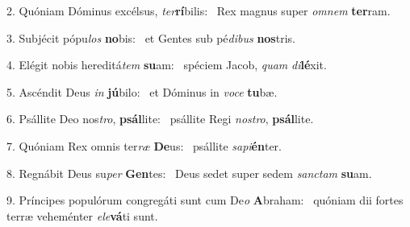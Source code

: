 2. Quóniam Dóminus excélsus, \textit{ter}\textbf{rí}bilis: \ast\  Rex magnus super \textit{om}\textit{nem} \textbf{ter}ram.\

3. Subjécit pópu\textit{los} \textbf{no}bis: \ast\  et Gentes sub pé\textit{di}\textit{bus} \textbf{nos}tris.\

4. Elégit nobis hereditá\textit{tem} \textbf{su}am: \ast\  spéciem Jacob, \textit{quam} \textit{di}\textbf{lé}xit.\

5. Ascéndit Deus \textit{in} \textbf{jú}bilo: \ast\  et Dóminus in \textit{vo}\textit{ce} \textbf{tu}bæ.\

6. Psállite Deo nos\textit{tro}, \textbf{psál}lite: \ast\  psállite Regi \textit{nos}\textit{tro}, \textbf{psál}lite.\

7. Quóniam Rex omnis ter\textit{ræ} \textbf{De}us: \ast\  psállite \textit{sa}\textit{pi}\textbf{én}ter.\

8. Regnábit Deus su\textit{per} \textbf{Gen}tes: \ast\  Deus sedet super sedem \textit{sanc}\textit{tam} \textbf{su}am.\

9. Príncipes populórum congregáti sunt cum De\textit{o} \textbf{A}braham: \ast\  quóniam dii fortes terræ veheménter \textit{e}\textit{le}\textbf{vá}ti sunt.\

